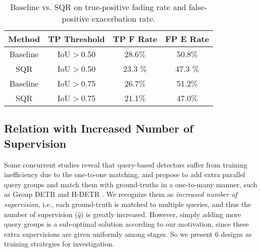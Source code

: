 \documentclass[10pt,twocolumn,letterpaper]{article}
\begin{document}
\begin{table}[]
    \centering
    \begin{tabular}{c|c|c|c}
        \toprule[1pt]
        Method       & TP Threshold & TP F Rate & FP E Rate \\ 
        \midrule
        Baseline & IoU$>$0.50 & 28.6$\%$   & 50.8$\%$ \\
        SQR      & IoU$>$0.50 &  23.3 $\%$ & 47.3 $\%$ \\
        \midrule
        Baseline & IoU$>$0.75 & 26.7$\%$ & 51.2$\%$  \\
        SQR      & IoU$>$0.75 & 21.1$\%$ & 47.0$\%$  \\
        \bottomrule
    \end{tabular}
    \caption{Baseline vs. SQR on true-positive fading rate and false-positive exacerbation rate. }
    \label{tab:ablation_FErates}
\end{table}


\subsection{Relation with Increased Number of Supervision}






Some concurrent studies reveal that query-based detectors suffer from training inefficiency due to the one-to-one matching, and propose to add extra parallel query groups and match them with ground-truths in a one-to-many manner, such as Group DETR \cite{Chen2022GroupDF} and H-DETR \cite{Jia2022DETRsWH}. We recognize them as \emph{increased number of supervision}, i.e., each ground-truth is matched to multiple queries, and thus the number of supervision ($\hat{q}$) is greatly increased. However, simply adding more query groups is a sub-optimal solution according to our motivation, since these extra supervisions are given uniformly among stages. So we present 6 designs as training strategies for investigation.
\end{document}

